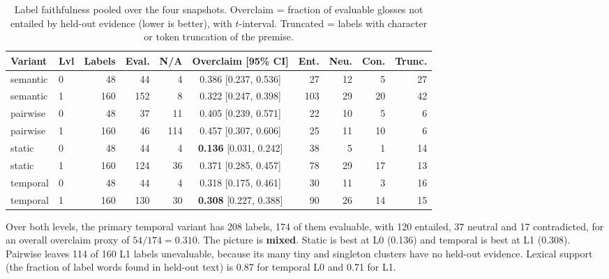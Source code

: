 \documentclass[11pt,a4paper]{article}
\theoremstyle{remark}
\begin{document}
\begin{table}[!htbp]
\centering
\caption{Label faithfulness pooled over the four snapshots. Overclaim = fraction of evaluable
glosses not entailed by held-out evidence (lower is better), with $t$-interval.
Truncated = labels with character or token truncation of the premise.}
\label{tab:labels}
\small
\begin{tabular}{llrrrcrrrr}
\toprule
Variant & Lvl & Labels & Eval. & N/A & Overclaim [95\% CI] & Ent. & Neu. & Con. & Trunc.\\
\midrule
semantic & 0 & 48 & 44 & 4 & 0.386 [0.237, 0.536] & 27 & 12 & 5 & 27\\
semantic & 1 & 160 & 152 & 8 & 0.322 [0.247, 0.398] & 103 & 29 & 20 & 42\\
pairwise & 0 & 48 & 37 & 11 & 0.405 [0.239, 0.571] & 22 & 10 & 5 & 6\\
pairwise & 1 & 160 & 46 & 114 & 0.457 [0.307, 0.606] & 25 & 11 & 10 & 6\\
static & 0 & 48 & 44 & 4 & \textbf{0.136} [0.031, 0.242] & 38 & 5 & 1 & 14\\
static & 1 & 160 & 124 & 36 & 0.371 [0.285, 0.457] & 78 & 29 & 17 & 13\\
temporal & 0 & 48 & 44 & 4 & 0.318 [0.175, 0.461] & 30 & 11 & 3 & 16\\
temporal & 1 & 160 & 130 & 30 & \textbf{0.308} [0.227, 0.388] & 90 & 26 & 14 & 15\\
\bottomrule
\end{tabular}
\end{table}

Over both levels, the primary temporal variant has 208 labels, 174 of them evaluable, with
120 entailed, 37 neutral and 17 contradicted, for an overall overclaim proxy of
$54/174=0.310$. The picture is \textbf{mixed}. Static is best at L0 (0.136) and temporal is best
at L1 (0.308). Pairwise leaves 114 of 160 L1 labels unevaluable, because its many tiny and
singleton clusters have no held-out evidence. Lexical support (the fraction of label words
found in held-out text) is 0.87 for temporal L0 and 0.71 for L1.
\end{document}
